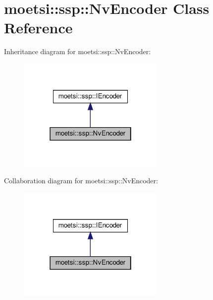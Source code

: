 \hypertarget{classmoetsi_1_1ssp_1_1NvEncoder}{}\section{moetsi\+:\+:ssp\+:\+:Nv\+Encoder Class Reference}
\label{classmoetsi_1_1ssp_1_1NvEncoder}


Inheritance diagram for moetsi\+:\+:ssp\+:\+:Nv\+Encoder\+:
\nopagebreak
\begin{figure}[H]
\begin{center}
\leavevmode
\includegraphics[width=202pt]{classmoetsi_1_1ssp_1_1NvEncoder__inherit__graph}
\end{center}
\end{figure}


Collaboration diagram for moetsi\+:\+:ssp\+:\+:Nv\+Encoder\+:
\nopagebreak
\begin{figure}[H]
\begin{center}
\leavevmode
\includegraphics[width=202pt]{classmoetsi_1_1ssp_1_1NvEncoder__coll__graph}
\end{center}
\end{figure}
